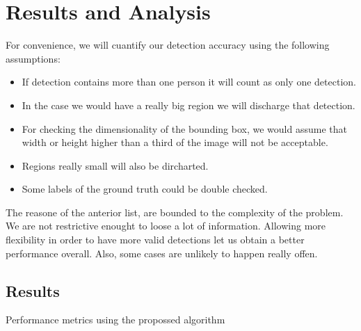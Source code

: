 \documentclass[11pt]{article}
\begin{document}


\section{Results and Analysis}

For convenience, we will cuantify our detection accuracy using the following assumptions:

\begin{itemize}
    \item If detection contains more than one person it will count as only one detection.
    \item In the case we would have a really big region we will discharge that detection.
    \item For checking the dimensionality of the bounding box, we would assume that width or height higher than a third of the image will not be acceptable.
    \item Regions really small will also be dircharted.
    \item Some labels of the ground truth could be double checked.
\end{itemize}

The reasone of the anterior list, are bounded to the complexity of the problem. We are not restrictive enought to loose a lot of information. Allowing more flexibility in order to have more valid detections let us obtain a better performance overall. Also, some cases are unlikely to happen really offen.

\subsection*{Results}

\begin{table} [hp]
    \centering
    \caption[Performance metrics Basic]{Performance metrics using the propossed algorithm}\label{table:metrics}
\end{table}
\end{document}
